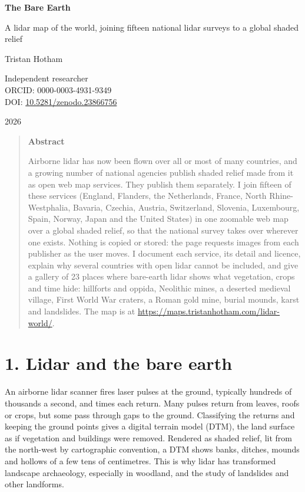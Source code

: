 \documentclass[11pt,a4paper]{article}
\begin{document}
\begin{center}
{\Large\bfseries The Bare Earth\par}\vspace{0.4em}
{\large A lidar map of the world, joining fifteen national lidar surveys to a global shaded relief\par}\vspace{1.1em}
{\large Tristan Hotham\par}\vspace{0.3em}
{\small Independent researcher\\ ORCID: 0000-0003-4931-9349\\ DOI: \href{https://doi.org/10.5281/zenodo.23866756}{10.5281/zenodo.23866756}\par}\vspace{0.7em}
2026
\end{center}
\begin{quote}\small\begin{center}\textbf{Abstract}\end{center}
Airborne lidar has now been flown over all or most of many countries, and a growing number of national agencies publish shaded relief made from it as open web map services. They publish them separately. I join fifteen of these services (England, Flanders, the Netherlands, France, North Rhine-Westphalia, Bavaria, Czechia, Austria, Switzerland, Slovenia, Luxembourg, Spain, Norway, Japan and the United States) in one zoomable web map over a global shaded relief, so that the national survey takes over wherever one exists. Nothing is copied or stored: the page requests images from each publisher as the user moves. I document each service, its detail and licence, explain why several countries with open lidar cannot be included, and give a gallery of 23 places where bare-earth lidar shows what vegetation, crops and time hide: hillforts and oppida, Neolithic mines, a deserted medieval village, First World War craters, a Roman gold mine, burial mounds, karst and landslides. The map is at \url{https://maps.tristanhotham.com/lidar-world/}.
\end{quote}
\section*{1. Lidar and the bare earth}
An airborne lidar scanner fires laser pulses at the ground, typically hundreds of thousands a second, and times each return. Many pulses return from leaves, roofs or crops, but some pass through gaps to the ground. Classifying the returns and keeping the ground points gives a digital terrain model (DTM), the land surface as if vegetation and buildings were removed. Rendered as shaded relief, lit from the north-west by cartographic convention, a DTM shows banks, ditches, mounds and hollows of a few tens of centimetres. This is why lidar has transformed landscape archaeology, especially in woodland, and the study of landslides and other landforms.
\end{document}
